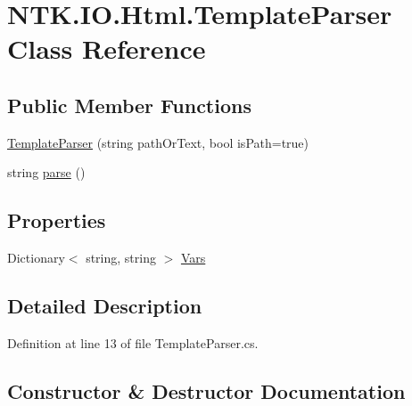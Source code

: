 \hypertarget{class_n_t_k_1_1_i_o_1_1_html_1_1_template_parser}{}\section{N\+T\+K.\+I\+O.\+Html.\+Template\+Parser Class Reference}
\label{class_n_t_k_1_1_i_o_1_1_html_1_1_template_parser}


 


\subsection*{Public Member Functions}
\begin{DoxyCompactItemize}
\item 
\mbox{\hyperlink{class_n_t_k_1_1_i_o_1_1_html_1_1_template_parser_a00fe35c5508ae935f4a40305b6e2c74b}{Template\+Parser}} (string path\+Or\+Text, bool is\+Path=true)
\item 
string \mbox{\hyperlink{class_n_t_k_1_1_i_o_1_1_html_1_1_template_parser_ab7f5ba6329b8edc059afdac7f12c39c7}{parse}} ()
\end{DoxyCompactItemize}
\subsection*{Properties}
\begin{DoxyCompactItemize}
\item 
Dictionary$<$ string, string $>$ \mbox{\hyperlink{class_n_t_k_1_1_i_o_1_1_html_1_1_template_parser_a48be89a9103c1e886ebcd41407483bfe}{Vars}}
\end{DoxyCompactItemize}


\subsection{Detailed Description}




Definition at line 13 of file Template\+Parser.\+cs.



\subsection{Constructor \& Destructor Documentation}
\mbox{\label{class_n_t_k_1_1_i_o_1_1_html_1_1_template_parser_a00fe35c5508ae935f4a40305b6e2c74b}} 
